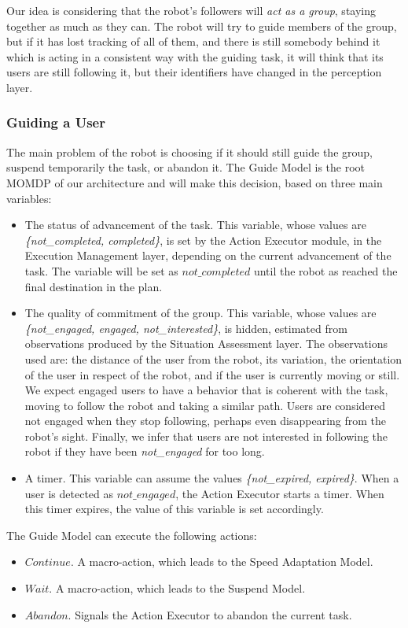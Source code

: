 Our idea is considering that the robot's followers will \textit{act as a group}, staying together as much as they can. The robot will try to guide members of the group, but if it has lost tracking of all of them, and there is still somebody behind it which is acting in a consistent way with the guiding task, it will think that its users are still following it, but their identifiers have changed in the perception layer.


\subsubsection{Guiding a User}
The main problem of the robot is choosing if it should still guide the group, suspend temporarily the task, or abandon it. The Guide Model is the root MOMDP of our architecture and will make this decision, based on three main variables: 
\begin{itemize}
\item The status of advancement of the task. This variable, whose values are \textit{\{not\_completed, completed\}}, is set by the Action Executor module, in the Execution Management layer, depending on the current advancement of the task. The variable will be set as $not\_completed$ until the robot as reached the final destination in the plan. 
\item The quality of commitment of the group. This variable, whose values are \textit{\{not\_engaged, engaged, not\_interested\}}, is hidden, estimated from observations produced by the Situation Assessment layer. The observations used are: the distance of the user from the robot, its variation, the orientation of the user in respect of the  robot, and if the user is currently moving or still. We expect engaged users to have a behavior that is coherent with the task, moving to follow the robot and taking a similar path. Users are considered not engaged when they stop following, perhaps even disappearing from the robot's sight. Finally, we infer that users are not interested in following the robot if they have been \textit{not\_engaged}  for too long.
\item A timer. This variable can assume the values \textit{\{not\_expired, expired\}}. When a user is detected as $not\_engaged$, the Action Executor starts a timer. When this timer expires, the value of this variable is set accordingly.
\end{itemize}

The Guide Model can execute the following actions:
\begin{itemize}
\item $Continue$. A macro-action, which leads to the Speed Adaptation Model.
\item $Wait$. A macro-action, which leads to the Suspend Model.
\item $Abandon$. Signals the Action Executor to abandon the current task.
\end{itemize}

